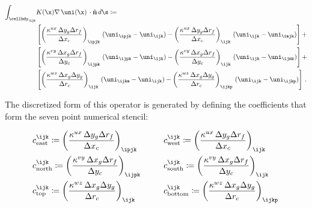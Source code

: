 \documentclass[alpha-refs]{wiley-article}
\begin{document}
\begin{linenomath*}\begin{equation}
    \begin{aligned}
        \int_{\cellbdy_\ijk}
        &K(\x)\nabla\,\uni(\x)\,
        \cdot \hat{\mathbf{n}} \, d\s
        \coloneqq \\
        &\left[
            \left(
                \dfrac{\kappa^{ux} \, \Delta y_g \Delta r_f}{\Delta x_c}
            \right)_\ipjk \,
            (\uni_\ipjk - \uni_\ijk) -
            \left(
                \dfrac{\kappa^{ux} \, \Delta y_g \Delta r_f}{\Delta x_c}
            \right)_\ijk \,
            (\uni_\ijk - \uni_\imjk)
        \right]+
        \\
        &\left[
            \left(
                \dfrac{\kappa^{vy} \, \Delta x_g \Delta r_f}{\Delta y_c}
            \right)_\ijpk \,
            (\uni_\ijpk - \uni_\ijk) -
            \left(
                \dfrac{\kappa^{vy} \, \Delta x_g \Delta r_f}{\Delta y_c}
            \right)_\ijk \,
            (\uni_\ijk - \uni_\ijmk)
        \right]+
        \\
        &\left[
            \left(
                \dfrac{\kappa^{wz} \, \Delta x_g \Delta y_g}{\Delta r_c}
            \right)_\ijk \,
            (\uni_\ijkm - \uni_\ijk) -
            \left(
                \dfrac{\kappa^{wz} \, \Delta x_g \Delta y_g}{\Delta r_c}
            \right)_\ijkp \,
            (\uni_\ijk - \uni_\ijkp)
        \right]
        \, .
    \end{aligned}
    \label{eq:big_laplacian}
\end{equation}\end{linenomath*}
The discretized form of this operator is generated by defining the coefficients
that form the seven point numerical stencil:
\begin{linenomath*}\begin{equation*}
    \begin{aligned}
        &c_\text{east}^\ijk \coloneqq
            \left(
                \dfrac{\kappa^{ux} \, \Delta y_g \Delta r_f}{\Delta x_c}
            \right)_\ipjk \,
        \qquad
        &&c_\text{west}^\ijk \coloneqq
            \left(
                \dfrac{\kappa^{ux} \, \Delta y_g \Delta r_f}{\Delta x_c}
            \right)_\ijk \,
        \\
        &c_\text{north}^\ijk \coloneqq
            \left(
                \dfrac{\kappa^{vy} \, \Delta x_g \Delta r_f}{\Delta y_c}
            \right)_\ijpk \,
        &&c_\text{south}^\ijk \coloneqq
            \left(
                \dfrac{\kappa^{vy} \, \Delta x_g \Delta r_f}{\Delta y_c}
            \right)_\ijk \,
        \\
        &c_\text{top}^\ijk \coloneqq
            \left(
                \dfrac{\kappa^{wz} \, \Delta x_g \Delta y_g}{\Delta r_c}
            \right)_\ijk \,
        &&c_\text{bottom}^\ijk \coloneqq
            \left(
                \dfrac{\kappa^{wz} \, \Delta x_g \Delta y_g}{\Delta r_c}
            \right)_\ijkp \,
    \end{aligned}
\end{equation*}\end{linenomath*}
\end{document}
